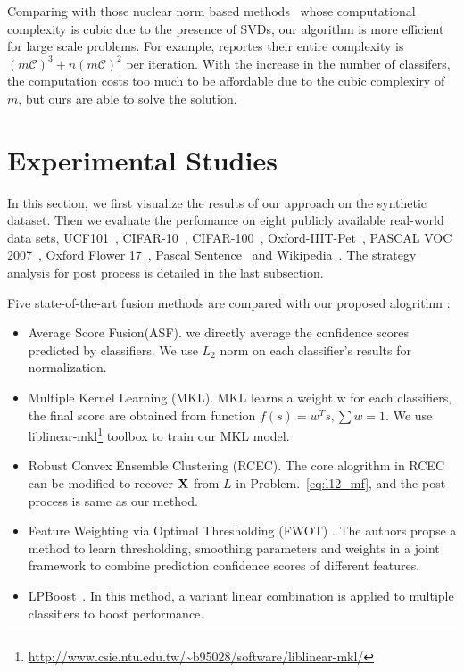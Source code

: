 \documentclass[10pt,twocolumn,letterpaper]{article}
\def\calC{{\mathcal{C}}}
\def\bX{{\bf X}}
\def\bX{{\bf X}}
\begin{document}
Comparing with those nuclear norm based methods~\cite{gaoijcai2016robust,ye2012robust} whose computational complexity is cubic due to the presence of SVDs,
our algorithm is more efficient for large scale problems.
For example, \cite{gaoijcai2016robust} reportes their entire complexity is $(m{\calC})^3+n(m{\calC})^2$ per iteration.
With the increase in the number of classifers,
the computation costs too much to be affordable due to the cubic complexiry of $m$,
but ours are able to solve the solution.

\section{Experimental Studies}

In this section, we first visualize the results of our approach on the synthetic dataset.
Then we evaluate the perfomance on eight publicly available real-world data sets,
UCF101~\cite{soomro2012ucf101}, CIFAR-10~\cite{krizhevsky2009learning}, CIFAR-100~\cite{krizhevsky2009learning}, Oxford-IIIT-Pet~\cite{parkhi2012cats}, PASCAL VOC 2007~\cite{pascal-voc-2007}, Oxford Flower 17~\cite{nilsback2006visual}, Pascal Sentence~\cite{rashtchian2010collecting} and Wikipedia~\cite{rasiwasia2010new}.
The strategy analysis for post process is detailed in the last subsection.



Five state-of-the-art fusion methods are compared with our proposed alogrithm :
\begin{itemize}
\item Average Score Fusion(ASF). we directly average the confidence scores predicted by classifiers. We use $L_2$ norm on each classifier's results for normalization.
\item Multiple Kernel Learning (MKL).  MKL learns a weight w for each classifiers, the final score are obtained from function $f(s)=w^{T}s, \sum w = 1$. We use liblinear-mkl\footnote{\url{http://www.csie.ntu.edu.tw/~b95028/software/liblinear-mkl/}} toolbox to train our MKL model.
\item Robust Convex Ensemble Clustering (RCEC)\cite{gaoijcai2016robust}.
The core alogrithm in RCEC can be modified to recover $\bX$ from $L$ in Problem.~\ref{eq:l12_mf}, and the post process is same as our method.
\item Feature Weighting via Optimal Thresholding (FWOT) \cite{xuiccv2013feature}.
The authors propse a method to learn thresholding, smoothing parameters and weights in a joint framework to combine prediction confidence scores of different features.
\item LPBoost~\cite{gehler2009feature}. In this method, a variant linear combination is applied to multiple classifiers to boost performance.
\end{itemize}
\end{document}
